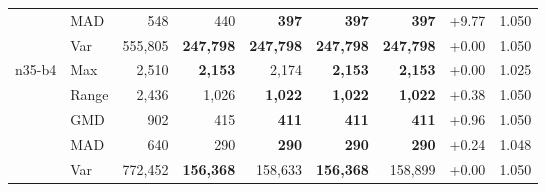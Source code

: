 \begin{small}
\begin{longtable}{llrrrrrrr}
 & MAD & 548 & 440 & \textbf{397} & \textbf{397} & \textbf{397} & +9.77 & 1.050 \\
 & Var & 555,805 & \textbf{247,798} & \textbf{247,798} & \textbf{247,798} & \textbf{247,798} & +0.00 & 1.050 \\
n35-b4 & Max & 2,510 & \textbf{2,153} & 2,174 & \textbf{2,153} & \textbf{2,153} & +0.00 & 1.025 \\
 & Range & 2,436 & 1,026 & \textbf{1,022} & \textbf{1,022} & \textbf{1,022} & +0.38 & 1.050 \\
 & GMD & 902 & 415 & \textbf{411} & \textbf{411} & \textbf{411} & +0.96 & 1.050 \\
 & MAD & 640 & 290 & \textbf{290} & \textbf{290} & \textbf{290} & +0.24 & 1.048 \\
 & Var & 772,452 & \textbf{156,368} & 158,633 & \textbf{156,368} & 158,899 & +0.00 & 1.050 \\
\end{longtable}
\end{small}
